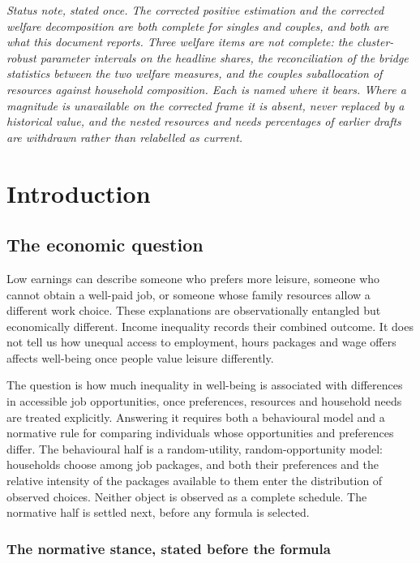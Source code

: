 \documentclass[11pt,a4paper]{article}
\begin{document}
\emph{Status note, stated once. The corrected positive estimation and the corrected welfare decomposition are both complete for singles and couples, and both are what this document reports. Three welfare items are not complete: the cluster-robust parameter intervals on the headline shares, the reconciliation of the bridge statistics between the two welfare measures, and the couples suballocation of resources against household composition. Each is named where it bears. Where a magnitude is unavailable on the corrected frame it is absent, never replaced by a historical value, and the nested resources and needs percentages of earlier drafts are withdrawn rather than relabelled as current.}

\section{Introduction}\label{introduction}

\subsection{The economic question}\label{the-economic-question}

Low earnings can describe someone who prefers more leisure, someone who cannot obtain a well-paid job, or someone whose family resources allow a different work choice. These explanations are observationally entangled but economically different. Income inequality records their combined outcome. It does not tell us how unequal access to employment, hours packages and wage offers affects well-being once people value leisure differently.

The question is how much inequality in well-being is associated with differences in accessible job opportunities, once preferences, resources and household needs are treated explicitly. Answering it requires both a behavioural model and a normative rule for comparing individuals whose opportunities and preferences differ. The behavioural half is a random-utility, random-opportunity model: households choose among job packages, and both their preferences and the relative intensity of the packages available to them enter the distribution of observed choices. Neither object is observed as a complete schedule. The normative half is settled next, before any formula is selected.

\subsubsection{The normative stance, stated before the formula}\label{the-normative-stance-stated-before-the-formula}
\end{document}
